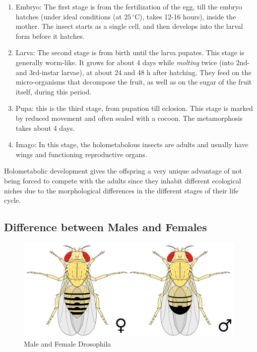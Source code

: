 		\par
		\begin{enumerate}
			\item Embryo: The first stage is from the fertilization of the egg, till the embryo hatches (under ideal conditions (at $25\,^{\circ}\mathrm{C}$), takes 12-16 hours), inside the mother. The insect starts as a single cell, and then develops into the larval form before it hatches.
			\item Larva: The second stage is from birth until the larva pupates. This stage is generally worm-like. It grows for about 4 days while \emph{molting} twice (into 2nd- and 3rd-instar larvae), at about 24 and 48 h after hatching. They feed on the micro-organisms that decompose the fruit, as well as on the sugar of the fruit itself, during this period.
			\item Pupa: this is the third stage, from pupation till eclosion. This stage is marked by reduced movement and often sealed with a cocoon. The metamorphosis takes about 4 days.
			\item Imago: In this stage, the holometabolous insects are adults and usually have wings and functioning reproductive organs.
		\end{enumerate}
		 Holometabolic development gives the offspring a very unique advantage of not being forced to compete with the adults since they inhabit different ecological niches due to the morphological differences in the different stages of their life cycle.
	\subsection{Difference between Males and Females}
		\begin{figure}[h]
			\begin{center}
				\includegraphics[width=.6\linewidth]{gfx/Male_Female_drosophila}
			\end{center}
		\caption[Male and Female Drosophila]{Male and Female Drosophila}
		\end{figure}

